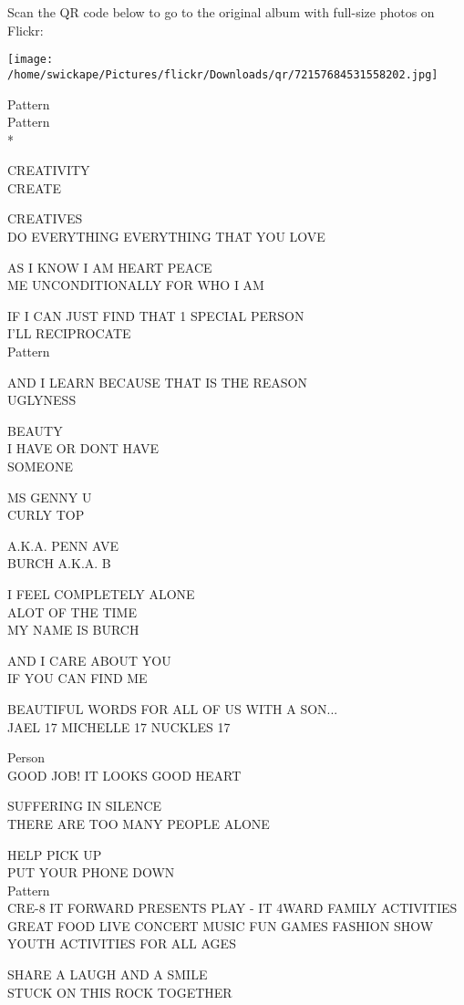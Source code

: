\documentclass[10pt,letterpaper]{article}
\begin{document}
Scan the QR code below to go to the original album with full-size photos on Flickr:

\texttt{[image: /home/swickape/Pictures/flickr/Downloads/qr/72157684531558202.jpg]}
\pagebreak

Pattern\\
Pattern\\
*

CREATIVITY\\
CREATE

CREATIVES\\
DO EVERYTHING EVERYTHING THAT YOU LOVE

AS I KNOW I AM HEART PEACE\\
ME UNCONDITIONALLY FOR WHO I AM

IF I CAN JUST FIND THAT 1 SPECIAL PERSON\\
I'LL RECIPROCATE\\
Pattern

AND I LEARN BECAUSE THAT IS THE REASON\\
UGLYNESS

BEAUTY\\
I HAVE OR DONT HAVE\\
SOMEONE

MS GENNY U\\
CURLY TOP

A.K.A. PENN AVE\\
BURCH A.K.A. B

I FEEL COMPLETELY ALONE\\
ALOT OF THE TIME\\
MY NAME IS BURCH

AND I CARE ABOUT YOU\\
IF YOU CAN FIND ME

BEAUTIFUL WORDS FOR ALL OF US WITH A SON...\\
JAEL 17 MICHELLE 17 NUCKLES 17

Person\\
GOOD JOB!  IT LOOKS GOOD HEART

SUFFERING IN SILENCE\\
THERE ARE TOO MANY PEOPLE ALONE

HELP PICK UP\\
PUT YOUR PHONE DOWN\\
Pattern\\
CRE{-}8 IT FORWARD PRESENTS PLAY {-} IT 4WARD FAMILY ACTIVITIES GREAT FOOD LIVE CONCERT MUSIC FUN GAMES FASHION SHOW YOUTH ACTIVITIES FOR ALL AGES

SHARE A LAUGH AND A SMILE\\
STUCK ON THIS ROCK TOGETHER
\end{document}
